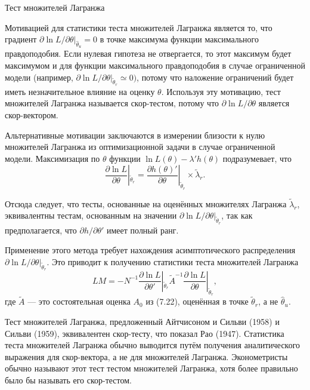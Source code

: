 \begin{center}
Тест множителей Лагранжа
\end{center}

Мотивацией для статистики теста множителей Лагранжа является то, что градиент $\partial{\ln L}/\partial{\theta}|_{\hat{\theta}_u} = 0$ в точке максимума функции максимального правдоподобия. Если нулевая гипотеза не отвергается, то этот максимум будет максимумом и для функции максимального правдоподобия в случае ограниченной модели (например, $\partial{\ln L}/\partial{\theta}|_{\tilde{\theta}_r} \simeq 0)$, потому что наложение ограничений будет иметь незначительное влияние на оценку $\theta$. Используя эту мотивацию, тест множителей Лагранжа называется  скор-тестом, потому что $\partial{\ln L}/\partial{\theta}$ является скор-вектором.

Альтернативные мотивации заключаются в измерении близости к нулю множителей Лагранжа из оптимизационной задачи в случае ограниченной модели. Максимизация по $\theta$ функции $\ln L(\theta) - \lambda'h(\theta)$ подразумевает, что
\begin{equation}
\frac{\partial{\ln L}}{\partial{\theta}}|_{\tilde{\theta}_r} = \frac{\partial{h(\theta)'}}{\partial{\theta}}|_{\tilde{\theta}_r} \times \tilde{\lambda}_r.
\end{equation}

Отсюда следует, что тесты, основанные на оценённых множителях Лагранжа $\tilde{\lambda}_r$, эквивалентны тестам, основанным на значении $\partial{\ln L}/\partial{\theta}|_{\tilde{\theta}_r}$, так как предполагается, что $\partial{h}/\partial{\theta}'$ имеет полный ранг.

Применение этого метода требует нахождения асимптотического распределения $\partial{\ln L}/\partial{\theta}|_{\tilde{\theta}_r}$. Это приводит к получению статистики теста множителей Лагранжа
\begin{equation}
LM = -N^{-1}\frac{\partial{\ln L}}{\partial{\theta}'}|_{\tilde{\theta}_r}\tilde{A}^{-1}\frac{\partial{\ln L}}{\partial{\theta}}|_{\tilde{\theta}_r}, 
\end{equation}
где $\tilde{A}$ --- это состоятельная оценка $A_0$ из (7.22), оценённая в точке $\tilde{\theta}_r$, а не $\hat{\theta}_u$.

Тест множителей Лагранжа, предложенный Айтчисоном и Сильви (1958) и Сильви (1959), эквивалентен скор-тесту, что показал Рао (1947). Статистика теста множителей Лагранжа обычно выводится путём получения аналитического выражения для скор-вектора, а не для множителей Лагранжа. Эконометристы обычно называют этот тест тестом множителей Лагранжа, хотя более правильно было бы называть его скор-тестом.

